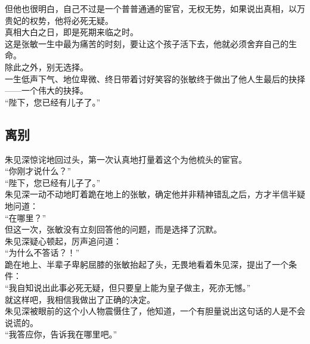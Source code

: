 \begin{multicols}{\theparacolNo}
但他也很明白，自己不过是一个普普通通的宦官，无权无势，如果说出真相，以万贵妃的权势，他将必死无疑。\\

真相大白之日，即是死期来临之时。\\

这是张敏一生中最为痛苦的时刻，要让这个孩子活下去，他就必须舍弃自己的生命。\\

除此之外，别无选择。\\

一生低声下气、地位卑微、终日带着讨好笑容的张敏终于做出了他人生最后的抉择——一个伟大的抉择。\\

“陛下，您已经有儿子了。”\\

\subsection{离别}
朱见深惊诧地回过头，第一次认真地打量着这个为他梳头的宦官。\\

“你刚才说什么？”\\

“陛下，您已经有儿子了。”\\

朱见深一动不动地盯着跪在地上的张敏，确定他并非精神错乱之后，方才半信半疑地问道：\\

“在哪里？”\\

但这一次，张敏没有立刻回答他的问题，而是选择了沉默。\\

朱见深疑心顿起，厉声追问道：\\

“为什么不答话？！”\\

跪在地上、半辈子卑躬屈膝的张敏抬起了头，无畏地看着朱见深，提出了一个条件：\\

“我自知说出此事必死无疑，但只要皇上能为皇子做主，死亦无憾。”\\

就这样吧，我相信我做出了正确的决定。\\

朱见深被眼前的这个小人物震慑住了，他知道，一个有胆量说出这句话的人是不会说谎的。\\

“我答应你，告诉我在哪里吧。”\\


\end{multicols}
